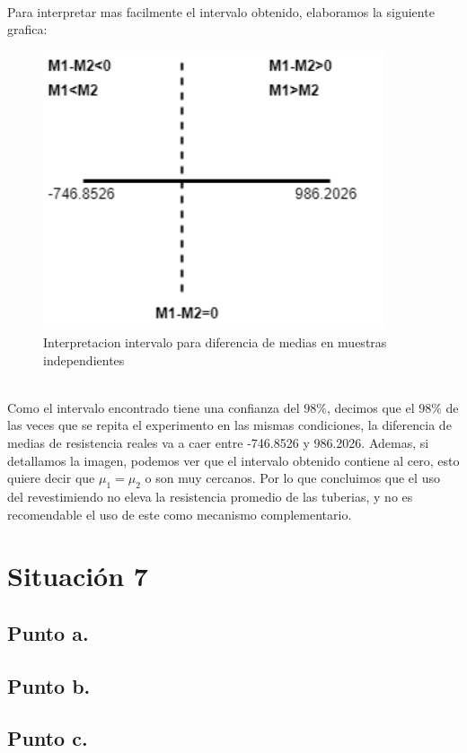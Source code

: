 \documentclass[letterpaper,12pt,onecolumn,titlepage]{article}
\begin{document}
~\\ Para interpretar mas facilmente el intervalo obtenido, elaboramos la siguiente grafica:
\begin{figure}[!h]
    \begin{center}
        \includegraphics[width=10cm]{Figuras/Grafico5.png}
        \caption{Interpretacion intervalo para diferencia de medias en muestras independientes}
        \label{fig:Densidad}
    \end{center}
\end{figure}
~\\ Como el intervalo encontrado tiene una confianza del $98\%$, decimos que el $98\%$ de las veces que se repita el experimento en las mismas condiciones, la diferencia de medias de resistencia reales va a caer entre -746.8526 y 986.2026. Ademas, si detallamos la imagen, podemos ver que el intervalo obtenido contiene al cero, esto quiere decir que $\mu_1=\mu_2$ o son muy cercanos. Por lo que concluimos que el uso del revestimiendo no eleva la resistencia promedio de las tuberias, y no es recomendable el uso de este como mecanismo complementario.

\pagebreak\section{Situaci\'{o}n 7}
\subsection{Punto a.}
\subsection{Punto b.}
\subsection{Punto c.}


\end{document}
